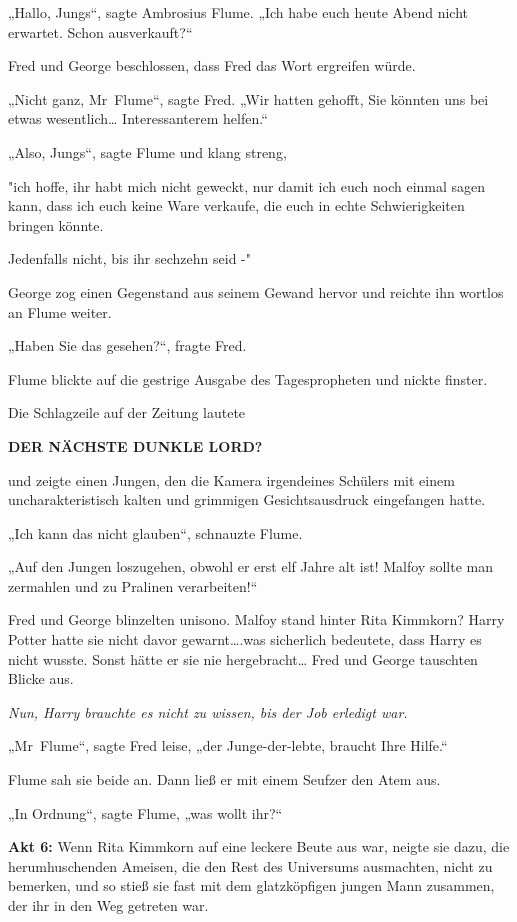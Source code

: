 {„Hallo, Jungs“, sagte Ambrosius Flume. „Ich habe euch heute Abend nicht erwartet. Schon ausverkauft?“

Fred und George beschlossen, dass Fred das Wort ergreifen würde.

„Nicht ganz, Mr~Flume“, sagte Fred. „Wir hatten gehofft, Sie könnten uns bei etwas wesentlich… Interessanterem helfen.“

„Also, Jungs“, sagte Flume und klang streng,

"ich hoffe, ihr habt mich nicht geweckt, nur damit ich euch noch einmal sagen kann, dass ich euch keine Ware verkaufe, die euch in echte Schwierigkeiten bringen könnte.

Jedenfalls nicht, bis ihr sechzehn seid -"

George zog einen Gegenstand aus seinem Gewand hervor und reichte ihn wortlos an Flume weiter.

„Haben Sie das gesehen?“, fragte Fred.

Flume blickte auf die gestrige Ausgabe des Tagespropheten und nickte finster.

Die Schlagzeile auf der Zeitung lautete

\textbf{DER NÄCHSTE DUNKLE LORD?}

und zeigte einen Jungen, den die Kamera irgendeines Schülers mit einem uncharakteristisch kalten und grimmigen Gesichtsausdruck eingefangen hatte.

„Ich kann das nicht glauben“, schnauzte Flume.

„Auf den Jungen loszugehen, obwohl er erst elf Jahre alt ist! Malfoy sollte man zermahlen und zu Pralinen verarbeiten!“

Fred und George blinzelten unisono. Malfoy stand hinter Rita Kimmkorn? Harry Potter hatte sie nicht davor gewarnt….was sicherlich bedeutete, dass Harry es nicht wusste. Sonst hätte er sie nie hergebracht… Fred und George tauschten Blicke aus.

\emph{Nun, Harry brauchte es nicht zu wissen, bis der Job erledigt war.}

„Mr~Flume“, sagte Fred leise, „der Junge-der-lebte, braucht Ihre Hilfe.“

Flume sah sie beide an. Dann ließ er mit einem Seufzer den Atem aus.

„In Ordnung“, sagte Flume, „was wollt ihr?“

\textbf{Akt 6:} Wenn Rita Kimmkorn auf eine leckere Beute aus war, neigte sie dazu, die herumhuschenden Ameisen, die den Rest des Universums ausmachten, nicht zu bemerken, und so stieß sie fast mit dem glatzköpfigen jungen Mann zusammen, der ihr in den Weg getreten war.

}
